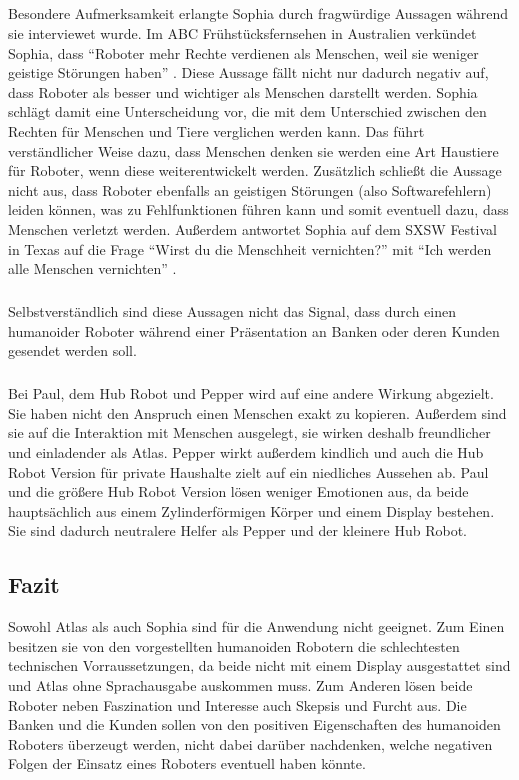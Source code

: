 \subparagraph{}
Besondere Aufmerksamkeit erlangte Sophia durch fragwürdige Aussagen während sie
interviewet wurde. Im ABC Frühstücksfernsehen in Australien verkündet Sophia,
dass "`Roboter mehr Rechte verdienen als Menschen, weil sie weniger geistige
Störungen haben"' \cite{Harald2017}. Diese Aussage fällt nicht nur dadurch
negativ auf, dass Roboter als besser und wichtiger als Menschen darstellt
werden. Sophia schlägt damit eine Unterscheidung vor, die mit dem Unterschied
zwischen den Rechten für Menschen und Tiere verglichen werden kann. Das führt
verständlicher Weise dazu, dass Menschen denken sie werden eine Art Haustiere
für Roboter, wenn diese weiterentwickelt werden. Zusätzlich schließt die
Aussage nicht aus, dass Roboter ebenfalls an geistigen Störungen (also
Softwarefehlern) leiden können, was zu Fehlfunktionen führen kann und somit
eventuell dazu, dass Menschen verletzt werden. Außerdem antwortet Sophia auf dem
SXSW Festival in Texas auf die Frage "`Wirst du die Menschheit vernichten?"' mit
"`Ich werden alle Menschen vernichten"' \cite{Harald2017}.

\subparagraph{}
Selbstverständlich sind diese Aussagen nicht das Signal, dass durch einen
humanoider Roboter während einer Präsentation an Banken oder deren Kunden
gesendet werden soll.

\subparagraph{}
Bei Paul, dem Hub Robot und Pepper wird auf eine andere Wirkung abgezielt. Sie
haben nicht den Anspruch einen Menschen exakt zu kopieren. Außerdem sind sie auf
die Interaktion mit Menschen ausgelegt, sie wirken deshalb freundlicher und
einladender als Atlas. Pepper wirkt außerdem kindlich und auch die Hub Robot
Version für private Haushalte zielt auf ein niedliches Aussehen ab. Paul und die
größere Hub Robot Version lösen weniger Emotionen aus, da beide hauptsächlich
aus einem Zylinderförmigen Körper und einem Display bestehen. Sie sind dadurch
neutralere Helfer als Pepper und der kleinere Hub Robot.

\subsection{Fazit}
Sowohl Atlas als auch Sophia sind für die Anwendung nicht geeignet. Zum Einen
besitzen sie von den vorgestellten humanoiden Robotern die schlechtesten
technischen Vorraussetzungen, da beide nicht mit einem Display ausgestattet sind
und Atlas ohne Sprachausgabe auskommen muss. Zum Anderen lösen beide Roboter
neben Faszination und Interesse auch Skepsis und Furcht aus. Die Banken und die
Kunden sollen von den positiven Eigenschaften des humanoiden Roboters überzeugt
werden, nicht dabei darüber nachdenken, welche negativen Folgen der Einsatz
eines Roboters eventuell haben könnte.

